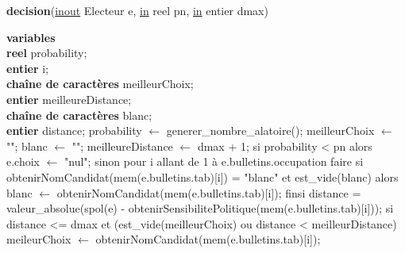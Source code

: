 \documentclass[12pt]{article} %
\begin{document}
\begin{algorithm}
	\caption{\textbf{decision}(\underline{inout} Electeur e, \underline{in} reel pn, \underline{in} entier dmax)}
	\begin{algorithmic}[1]
		\State \textbf{variables}\\ \textbf{reel} probability;\\ \textbf{entier} i;\\ \textbf{chaîne de caractères} meilleurChoix;\\ \textbf{entier} meilleureDistance;\\ \textbf{chaîne de caractères} blanc;\\ \textbf{entier} distance;
		\Start
		\State probability $\leftarrow$ generer\_nombre\_alatoire(); 
		\State meilleurChoix $\leftarrow$ "";
		\State blanc $\leftarrow$ "";
		\State meilleureDistance $\leftarrow$ dmax + 1;
		\State si probability < pn alors
		\State \hspace{\algorithmicindent} e.choix $\leftarrow$ "nul";
		\State sinon
		\State \hspace{\algorithmicindent} pour i allant de 1 à e.bulletins.occupation faire
		\State \hspace{\algorithmicindent}\hspace{\algorithmicindent} si obtenirNomCandidat(mem(e.bulletins.tab)[i]) = "blanc" et est\_vide(blanc) alors
		\State \hspace{\algorithmicindent}\hspace{\algorithmicindent}\hspace{\algorithmicindent} blanc $\leftarrow$ obtenirNomCandidat(mem(e.bulletins.tab)[i]);
		\State \hspace{\algorithmicindent}\hspace{\algorithmicindent} finsi
		\State \hspace{\algorithmicindent}\hspace{\algorithmicindent} distance = valeur\_absolue(spol(e) - obtenirSensibilitePolitique(mem(e.bulletins.tab)[i]));
		\State \hspace{\algorithmicindent}\hspace{\algorithmicindent} si distance <= dmax et (est\_vide(meilleurChoix) ou distance < meilleurDistance)
		\State \hspace{\algorithmicindent}\hspace{\algorithmicindent}\hspace{\algorithmicindent} meileurChoix $\leftarrow$ obtenirNomCandidat(mem(e.bulletins.tab)[i]);

\end{algorithmic}
\end{algorithm}
\end{document}
